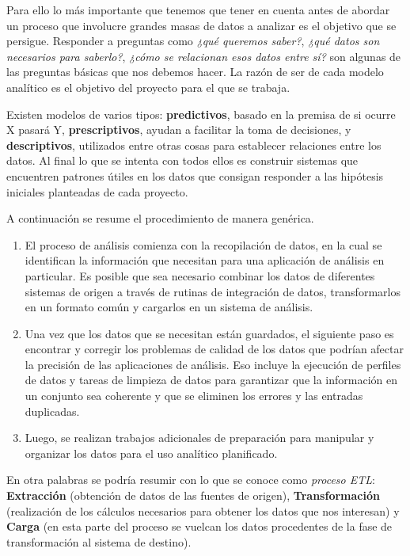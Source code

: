 Para ello lo más importante que tenemos que tener en cuenta antes de abordar un proceso que involucre grandes masas de datos a analizar es el objetivo que se persigue. Responder a preguntas como\textit{ ¿qué queremos saber?}, \textit{¿qué datos son necesarios para saberlo?}, \textit{¿cómo se relacionan esos datos entre sí?} son algunas de las preguntas básicas que nos debemos hacer. La razón de ser de cada modelo analítico es el objetivo del proyecto para el que se trabaja. 

Existen modelos de varios tipos: \textbf{predictivos}, basado en la premisa de si ocurre X pasará Y, \textbf{prescriptivos}, ayudan a facilitar la toma de decisiones, y \textbf{descriptivos}, utilizados entre otras cosas para establecer relaciones entre los datos. Al final lo que se intenta con todos ellos es construir sistemas que encuentren patrones útiles en los datos que consigan responder a las hipótesis iniciales planteadas de cada proyecto.

A continuación se resume el procedimiento de manera genérica. 
\begin{enumerate}
	\item El proceso de análisis comienza con la recopilación de datos, en la cual se identifican la información que necesitan para una aplicación de análisis en particular. Es posible que sea necesario combinar los datos de diferentes sistemas de origen a través de rutinas de integración de datos, transformarlos en un formato común y cargarlos en un sistema de análisis. 
	\item Una vez que los datos que se necesitan están guardados, el siguiente paso es encontrar y corregir los problemas de calidad de los datos que podrían afectar la precisión de las aplicaciones de análisis. Eso incluye la ejecución de perfiles de datos y tareas de limpieza de datos para garantizar que la información en un conjunto sea coherente y que se eliminen los errores y las entradas duplicadas.
	\item Luego, se realizan trabajos adicionales de preparación para manipular y organizar los datos para el uso analítico planificado.
\end{enumerate}

En otra palabras se podría resumir con lo que se conoce como \textit{proceso ETL}: \textbf{Extracción} (obtención de datos de las fuentes de origen), \textbf{Transformación} (realización de los cálculos necesarios para obtener los datos que nos interesan) y \textbf{Carga} (en esta parte del proceso se vuelcan los datos procedentes de la fase de transformación al sistema de destino).

